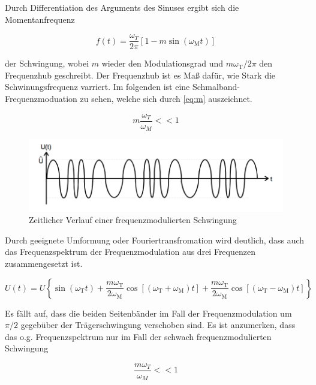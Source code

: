 \noindent Durch Differentiation des Arguments des Sinuses ergibt sich die Momentanfrequenz

\begin{equation}
f(t) = \frac{\omega_T}{2\pi}\left[1-m\sin(\omega_\text{M} t)\right]
\label{eq:momFreq}
\end{equation}

\noindent der Schwingung, wobei $m$ wieder den Modulationsgrad und $m\omega_\text{T}/2\pi$ den Frequenzhub geschreibt. Der Frequenzhub ist es Maß dafür, wie Stark die Schwinungsfrequenz varriert. Im folgenden ist eine Schmalband-Frequenzmoduation zu sehen, welche sich durch \ref{eq:m} auszeichnet.

\begin{equation}
m\frac{\omega_T}{\omega_M} << 1
\label{eq:m}
\end{equation}


\begin{figure}
	\centering
	\includegraphics[width=\textwidth]{img/Abb3.png}
	\caption{Zeitlicher Verlauf einer frequenzmodulierten Schwingung \cite{FP}}
\end{figure}

Durch geeignete Umformung oder Fouriertransfromation wird deutlich, dass auch das Frequenzspektrum der Frequenzmodulation aus drei Frequenzen zusammengesetzt ist.

\begin{equation}
U(t) = U \left\{ \sin( \omega_\text{T} t) + \frac{m\omega_\text{T}}{2\omega_\text{M}}
\cos\left[(\omega_\text{T} + \omega_\text{M}) t\right] +
\frac{m \omega_\text{T}}{2\omega_\text{M}}
\cos\left[( \omega_\text{T} - \omega_\text{M} ) t\right]\right\}
\label{eq:FreqFreqMod}
\end{equation}

\noindent Es fällt auf, dass die beiden Seitenbänder im Fall der Frequenzmodulation um $\pi/2$ gegebüber der Trägerschwingung verschoben sind. Es ist anzumerken, dass das o.g. Frequenzspektrum nur im Fall der schwach frequenzmodulierten Schwingung

\begin{equation}
\frac{m\omega_T}{\omega_M} << 1
\end{equation}

